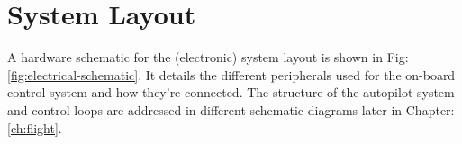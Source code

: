 \section{System Layout}
\label{sec:proto.layout}
{\centering
{}
}
\newpage
A hardware schematic for the (electronic) system layout is shown in Fig:\ref{fig:electrical-schematic}. It details the different peripherals used for the on-board control system and how they're connected. The structure of the autopilot system and control loops are addressed in different schematic diagrams later in Chapter:\ref{ch:flight}.

